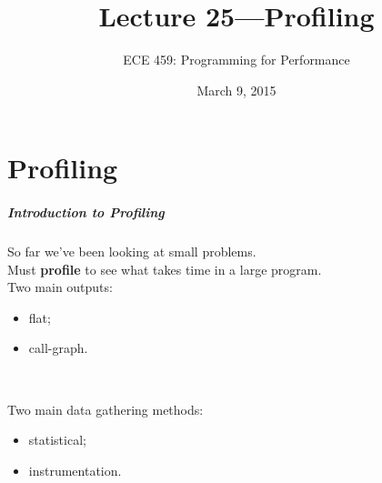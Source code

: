 \documentclass[aspectratio=43]{beamer}
\title{Lecture 25---Profiling}
\subtitle{ECE 459: Programming for Performance}
\date{March 9, 2015}
\newenvironment{changemargin}[1]{%
  \begin{list}{}{%
    \setlength{\topsep}{0pt}%
    \setlength{\leftmargin}{#1}%
    \setlength{\rightmargin}{1em}
    \setlength{\listparindent}{\parindent}%
    \setlength{\itemindent}{\parindent}%
    \setlength{\parsep}{\parskip}%
  }%
  \item[]}{\end{list}}
\begin{document}
\begin{frame}[plain]
  \titlepage
\end{frame}


\part{Profiling}
\frame{\partpage}

\begin{frame}
  \frametitle{Introduction to Profiling}

  \begin{changemargin}{2cm}
    So far we've been looking at small problems.\\[1em]
    Must {\bf profile} to see what takes time in a
      large program.\\[1em]
    Two main outputs:
      \begin{itemize}
        \item flat;
        \item call-graph.
      \end{itemize}
~\\[1em]
    \item Two main data gathering methods:
      \begin{itemize}
        \item statistical;
        \item instrumentation.
      \end{itemize}
  \end{changemargin}
\end{frame}
\end{document}
